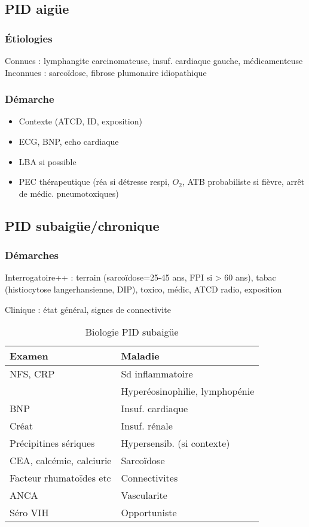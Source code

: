 \documentclass{article}
\begin{document}
\subsection{PID aigüe}
\subsubsection{Étiologies}
Connues : lymphangite carcinomateuse, insuf. cardiaque gauche, médicamenteuse\\
Inconnues : sarcoïdose, fibrose plumonaire idiopathique
\subsubsection{Démarche}
\begin{itemize}
\item Contexte (ATCD, ID, exposition)
\item ECG, BNP, echo cardiaque
\item LBA si possible
\item PEC thérapeutique (réa si détresse respi, \(O_2\), ATB probabiliste si fièvre, arrêt de médic. pneumotoxiques)
\end{itemize}

\subsection{PID subaigüe/chronique}
\subsubsection{Démarches}
Interrogatoire++ : terrain (sarcoïdose=25-45 ans, \gls{FPI} si > 60 ans), tabac (histiocytose langerhansienne, \gls{DIP}), toxico, médic, ATCD radio, exposition

Clinique : état général, signes de connectivite

\begin{table}[htbp]
  \caption{Biologie PID subaigüe}
  \centering
  \begin{tabular}{ll}
    \toprule
    Examen & Maladie\\
    \midrule
    NFS, CRP & Sd inflammatoire\\
           & Hyperéosinophilie, lymphopénie\\
    BNP & Insuf. cardiaque\\
    Créat & Insuf. rénale\\
    Précipitines sériques & Hypersensib. (si contexte)\\
    CEA, calcémie, calciurie & Sarcoïdose\\
    Facteur rhumatoïdes etc & Connectivites\\
    ANCA & Vascularite\\
    Séro VIH & Opportuniste\\
    \bottomrule
  \end{tabular}
\end{table}
\end{document}
